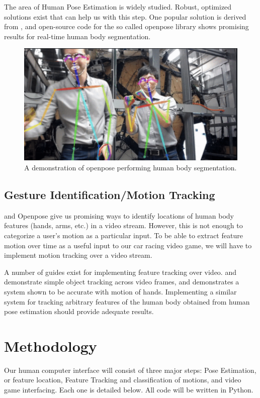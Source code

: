 \documentclass[10pt,twocolumn,letterpaper]{article}
\begin{document}
The area of Human Pose Estimation is widely studied. Robust, optimized solutions exist 
that can help us with this step. One popular solution is derived from \cite{8765346}, and 
open-source code for the so called openpose library shows promising results for real-time 
human body segmentation. 

\begin{figure}[h]
    \centering
    \includegraphics[width = .8\linewidth]{openpose.png}
    \caption{A demonstration of openpose performing human body segmentation.}
\end{figure}

\subsection{Gesture Identification/Motion Tracking}
\cite{8765346} and Openpose give us promising ways to identify locations of human body features 
(hands, arms, etc.) in a video stream. However, this is not enough to categorize a user's motion 
as a particular input. To be able to extract feature motion over time as a useful input to our 
car racing video game, we will have to implement motion tracking over a video stream. 

A number of guides exist for implementing feature tracking over video. \cite{tracking_1} 
and \cite{tracking_2} demonstrate simple object tracking across video frames, and \cite{tracking_2} 
demonstrates a system shown to be accurate with motion of hands. Implementing a similar system for 
tracking arbitrary features of the human body obtained from human pose estimation should provide 
adequate results.

\section{Methodology}
Our human computer interface will consist of three major steps: Pose Estimation, or feature 
location, Feature Tracking and classification of motions, and video game interfacing. Each one 
is detailed below. All code will be written in Python.
\end{document}
